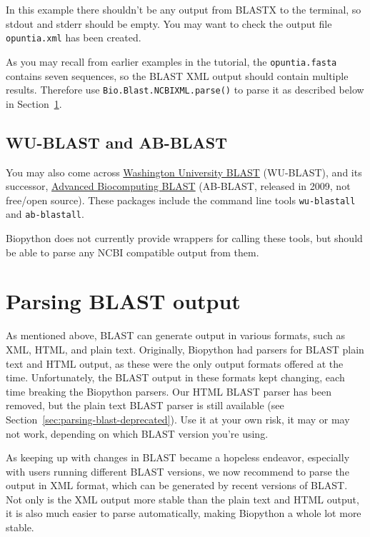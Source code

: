 \documentclass{report}
\begin{document}
In this example there shouldn't be any output from BLASTX to the terminal,
so stdout and stderr should be empty. You may want to check the output file
\verb|opuntia.xml| has been created.

As you may recall from earlier examples in the tutorial, the \verb|opuntia.fasta|
contains seven sequences, so the BLAST XML output should contain multiple results.
Therefore use \verb|Bio.Blast.NCBIXML.parse()| to parse it as described below in
Section~\ref{sec:parsing-blast}.

\subsection{WU-BLAST and AB-BLAST}

You may also come across \href{http://blast.wustl.edu/}{Washington University BLAST}
(WU-BLAST), and its successor, \href{http://blast.advbiocomp.com}{Advanced Biocomputing
BLAST} (AB-BLAST, released in 2009, not free/open source). These packages include
the command line tools \verb|wu-blastall| and \verb|ab-blastall|.

Biopython does not currently provide wrappers for calling these tools, but should be able
to parse any NCBI compatible output from them.

\section{Parsing BLAST output}
\label{sec:parsing-blast}

As mentioned above, BLAST can generate output in various formats, such as
XML, HTML, and plain text. Originally, Biopython had parsers for BLAST
plain text and HTML output, as these were the only output formats offered
at the time. Unfortunately, the BLAST output in these formats kept changing,
each time breaking the Biopython parsers. Our HTML BLAST parser has been
removed, but the plain text BLAST parser is still available (see
Section~\ref{sec:parsing-blast-deprecated}). Use it at your own risk,
it may or may not work, depending on which BLAST version you're using.

As keeping up with changes in BLAST
became a hopeless endeavor, especially with users running different BLAST
versions, we now recommend to parse the output in XML format, which can be
generated by recent versions of BLAST. Not only is the XML output more stable
than the plain text and HTML output, it is also much easier to parse
automatically, making Biopython a whole lot more stable.
\end{document}
